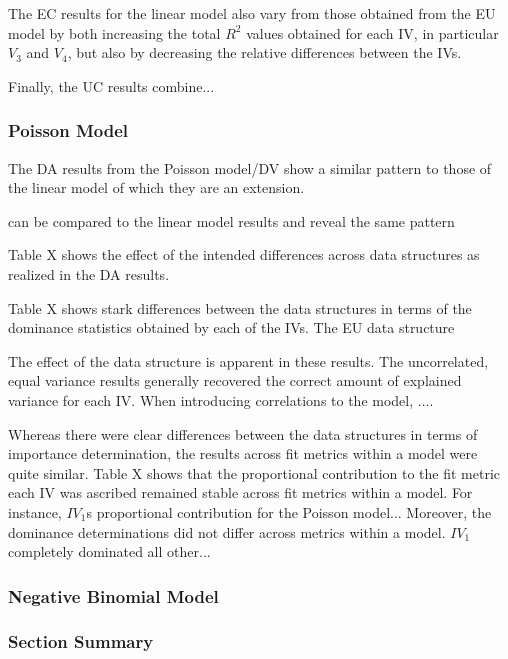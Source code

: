 \documentclass[ShortAfour,times,sageapa]{sagej}
\begin{document}
	
	The EC results for the linear model also vary from those obtained from the EU model by both increasing the total $R^2$ values obtained for each IV, in particular $V_3$ and $V_4$, but also by decreasing the relative differences between the IVs.
	
	Finally, the UC results combine...
	
	
	
		\subsubsection{Poisson Model}
		
	The DA results from the Poisson model/DV show a similar pattern to those of the linear model of which they are an extension.
	
	can be compared to the linear model results and reveal the same pattern
	
	Table X shows the effect of the intended differences across data structures as realized in the DA results.
	
	Table X shows stark differences between the data structures in terms of the dominance statistics obtained by each of the IVs.  The EU data structure
	
	The effect of the data structure is apparent in these results.  
	The uncorrelated, equal variance results generally recovered the correct amount of explained variance for each IV.  
	When introducing correlations to the model, ....
	
	Whereas there were clear differences between the data structures in terms of importance determination, the results across fit metrics within a model were quite similar.
	Table X shows that the proportional contribution to the fit metric each IV was ascribed remained stable across fit metrics within a model.
	For instance, $IV_1$s proportional contribution for the Poisson model...
	Moreover, the dominance determinations did not differ across metrics within a model.
	$IV_1$ completely dominated all other...
	
		\subsubsection{Negative Binomial Model}
	
		\subsubsection{Section Summary}
		
\end{document}
